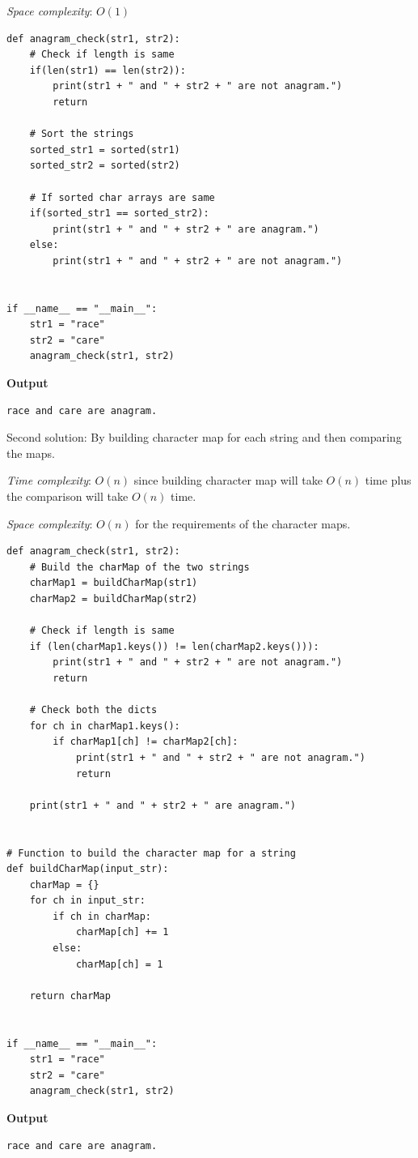 \documentclass[a4paper,11pt]{book}
\begin{document}
\noindent \textit{Space complexity}: $O(1)$
\begin{lstlisting}
def anagram_check(str1, str2):
    # Check if length is same
    if(len(str1) == len(str2)):
        print(str1 + " and " + str2 + " are not anagram.")
        return

    # Sort the strings
    sorted_str1 = sorted(str1)
    sorted_str2 = sorted(str2)

    # If sorted char arrays are same
    if(sorted_str1 == sorted_str2):
        print(str1 + " and " + str2 + " are anagram.")
    else:
        print(str1 + " and " + str2 + " are not anagram.")


if __name__ == "__main__":
    str1 = "race"
    str2 = "care"
    anagram_check(str1, str2)
\end{lstlisting}
\textbf{Output}
\begin{lstlisting}
race and care are anagram.
\end{lstlisting}

\noindent Second solution: By building character map for each string and then comparing the maps.

\noindent \textit{Time complexity}:  $O(n)$ since building character map will take  $O(n)$ time plus the comparison will take $O(n)$ time.

\noindent \textit{Space complexity}: $O(n)$ for the requirements of the character maps.
\begin{lstlisting}
def anagram_check(str1, str2):
    # Build the charMap of the two strings
    charMap1 = buildCharMap(str1)
    charMap2 = buildCharMap(str2)

    # Check if length is same
    if (len(charMap1.keys()) != len(charMap2.keys())):
        print(str1 + " and " + str2 + " are not anagram.")
        return

    # Check both the dicts
    for ch in charMap1.keys():
        if charMap1[ch] != charMap2[ch]:
            print(str1 + " and " + str2 + " are not anagram.")
            return

    print(str1 + " and " + str2 + " are anagram.")


# Function to build the character map for a string
def buildCharMap(input_str):
    charMap = {}
    for ch in input_str:
        if ch in charMap:
            charMap[ch] += 1
        else:
            charMap[ch] = 1

    return charMap


if __name__ == "__main__":
    str1 = "race"
    str2 = "care"
    anagram_check(str1, str2)
\end{lstlisting}
\textbf{Output}
\begin{lstlisting}
race and care are anagram.
\end{lstlisting}
\end{document}
